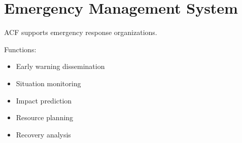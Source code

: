 \section{Emergency Management System}


ACF supports emergency response organizations.



Functions:


\begin{itemize}

\item Early warning dissemination

\item Situation monitoring

\item Impact prediction

\item Resource planning

\item Recovery analysis

\end{itemize}
